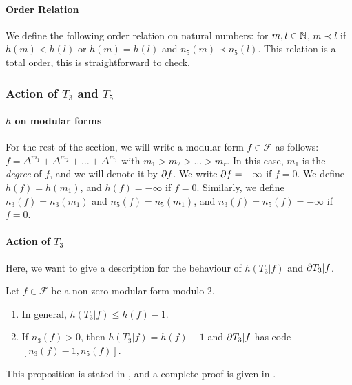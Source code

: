 \paragraph{Order Relation}
We define the following order relation on natural numbers:
for $m, l \in \mathbb{N}$, $m \prec l$ if $h(m) < h(l)$ or $h(m) = h(l)$ and $n_5(m) \prec n_5(l)$.
This relation is a total order, this is straightforward to check.

\subsubsection{Action of $T_3$ and $T_5$}
\paragraph{$h$ on modular forms}
For the rest of the section, we will write a modular form $f \in \mathcal{F}$ as follows:
$f = \Delta^{m_1} + \Delta^{m_2} + \dots + \Delta^{m_r}$ with $m_1 > m_2 > \dots > m_r$.
In this case, $m_1$ is the \textit{degree} of $f$, and we will denote it by $\partial f$.
We write $\partial f = -\infty$ if $f=0$.
We define $h(f) = h(m_1)$, and $h(f) = -\infty$ if $f=0$.
Similarly, we define $n_3(f) = n_3(m_1)$ and $n_5(f) = n_5(m_1)$, and $n_3(f) = n_5(f) = -\infty$ if $f=0$.

\paragraph{Action of $T_3$}
Here, we want to give a description for the behaviour of $h(T_3|f)$ and $\partial T_3|f$.
\label{propositionActionT3}
\begin{proposition}
	Let $f \in \mathcal{F}$ be a non-zero modular form modulo 2.
	\begin{enumerate}
		\item In general, $h(T_3|f) \leq h(f)-1$.
		\item If $n_3(f)>0$, then $h(T_3|f) = h(f)-1$ and $\partial T_3|f$ has code $\left[ n_3(f)-1, n_5(f) \right] $.
	\end{enumerate}
\end{proposition}
This proposition is stated in \cite[§4]{OrdreNilpotenceOperateurHecke}, and a complete proof is given in \cite{ModularFormsMcGill}.

